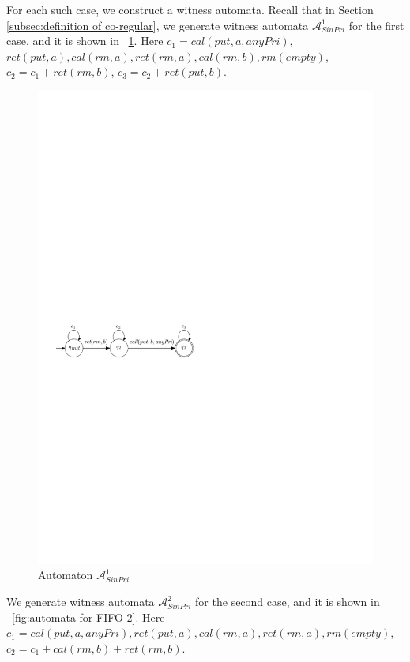 For each such case, we construct a witness automata. Recall that in Section \ref{subsec:definition of co-regular}, we generate witness automata $\mathcal{A}_{\textit{SinPri}}^1$ for the first case, and it is shown in \figurename~\ref{fig:automata for FIFO-1 in appendix}. Here $c_1 = \textit{cal}(\textit{put},a,\textit{anyPri})$, $\textit{ret}(\textit{put},a), \textit{cal}(\textit{rm},a),\textit{ret}(\textit{rm},a),\textit{cal}(\textit{rm},b),\textit{rm}(\textit{empty})$, $c_2 = c_1 + \textit{ret}(\textit{rm},b)$, $c_3 = c_2 + \textit{ret}(\textit{put},b)$.


\begin{figure}[htbp]
  \centering
  \includegraphics[width=0.6 \textwidth]{figures/PIC_AUTO_FIFO_1.pdf}
  \caption{Automaton $\mathcal{A}_{\textit{SinPri}}^1$}
  \label{fig:automata for FIFO-1 in appendix}
\end{figure}


We generate witness automata $\mathcal{A}_{\textit{SinPri}}^2$ for the second case, and it is shown in \figurename~\ref{fig:automata for FIFO-2}. Here $c_1 = \textit{cal}(\textit{put},a,\textit{anyPri}),\textit{ret}(\textit{put},a), \textit{cal}(\textit{rm},a),\textit{ret}(\textit{rm},a),\textit{rm}(\textit{empty})$, $c_2 = c_1 + \textit{cal}(\textit{rm},b) + \textit{ret}(\textit{rm},b)$.


